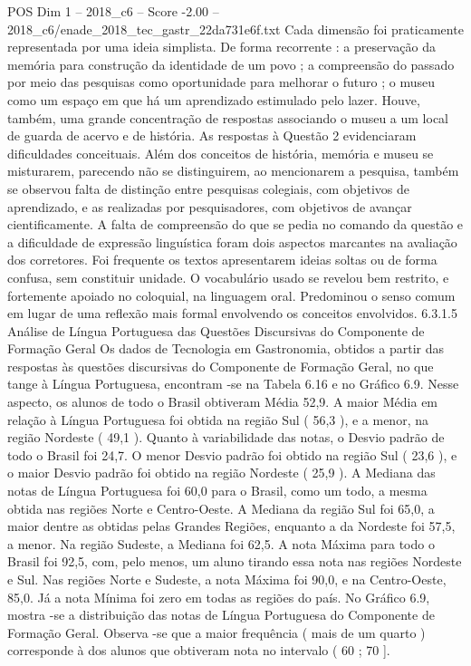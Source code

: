 \begin{textsample}{POS Dim 1 – 2018\_c6 – Score -2.00 – 2018\_c6/enade\_2018\_tec\_gastr\_22da731e6f.txt}
Cada dimensão foi praticamente representada por uma ideia simplista.
De forma recorrente : a preservação da memória para construção da identidade de um povo ; a compreensão do passado por meio das pesquisas como oportunidade para melhorar o futuro ; o museu como um espaço em que há um aprendizado estimulado pelo lazer.
Houve, também, uma grande concentração de respostas associando o museu a um local de guarda de acervo e de história.
As respostas à Questão 2 evidenciaram dificuldades conceituais.
Além dos conceitos de história, memória e museu se misturarem, parecendo não se distinguirem, ao mencionarem a pesquisa, também se observou falta de distinção entre pesquisas colegiais, com objetivos de aprendizado, e as realizadas por pesquisadores, com objetivos de avançar cientificamente.
A falta de compreensão do que se pedia no comando da questão e a dificuldade de expressão linguística foram dois aspectos marcantes na avaliação dos corretores.
Foi frequente os textos apresentarem ideias soltas ou de forma confusa, sem constituir unidade.
O vocabulário usado se revelou bem restrito, e fortemente apoiado no coloquial, na linguagem oral.
Predominou o senso comum em lugar de uma reflexão mais formal envolvendo os conceitos envolvidos. 6.3.1.5 Análise de Língua Portuguesa das Questões Discursivas do Componente de Formação Geral Os dados de Tecnologia em Gastronomia, obtidos a partir das respostas às questões discursivas do Componente de Formação Geral, no que tange à Língua Portuguesa, encontram -se na Tabela 6.16 e no Gráfico 6.9.
Nesse aspecto, os alunos de todo o Brasil obtiveram Média 52,9.
A maior Média em relação à Língua Portuguesa foi obtida na região Sul ( 56,3 ), e a menor, na região Nordeste ( 49,1 ).
Quanto à variabilidade das notas, o Desvio padrão de todo o Brasil foi 24,7.
O menor Desvio padrão foi obtido na região Sul ( 23,6 ), e o maior Desvio padrão foi obtido na região Nordeste ( 25,9 ).
A Mediana das notas de Língua Portuguesa foi 60,0 para o Brasil, como um todo, a mesma obtida nas regiões Norte e Centro-Oeste.
A Mediana da região Sul foi 65,0, a maior dentre as obtidas pelas Grandes Regiões, enquanto a da Nordeste foi 57,5, a menor.
Na região Sudeste, a Mediana foi 62,5.
A nota Máxima para todo o Brasil foi 92,5, com, pelo menos, um aluno tirando essa nota nas regiões Nordeste e Sul.
Nas regiões Norte e Sudeste, a nota Máxima foi 90,0, e na Centro-Oeste, 85,0.
Já a nota Mínima foi zero em todas as regiões do país.
No Gráfico 6.9, mostra -se a distribuição das notas de Língua Portuguesa do Componente de Formação Geral.
Observa -se que a maior frequência ( mais de um quarto ) corresponde à dos alunos que obtiveram nota no intervalo ( 60 ; 70 ].

\end{textsample}
